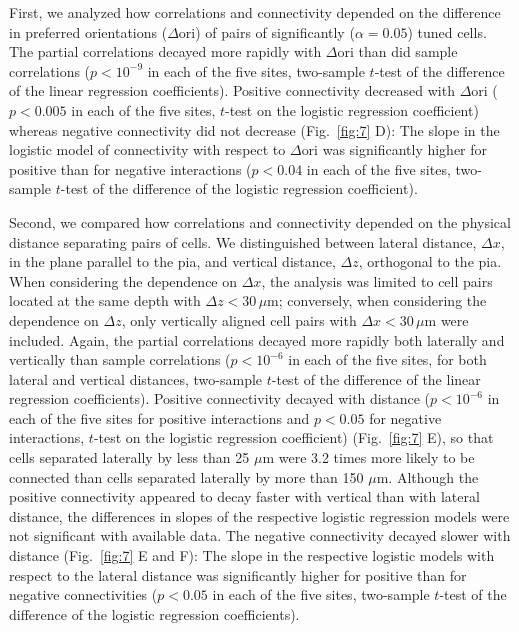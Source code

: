 First, we analyzed how correlations and connectivity depended on the difference in preferred orientations ($\Delta \mbox{ori}$) of pairs of significantly ($\alpha=0.05$) tuned cells. The partial correlations decayed more rapidly with $\Delta\mbox{ori}$ than did sample correlations ($p<10^{-9}$ in each of the five sites, two-sample $t$-test of the difference of the linear regression coefficients). Positive connectivity decreased with $\Delta\mbox{ori}$ ($p<0.005$ in each of the five sites, $t$-test on the logistic regression coefficient) whereas negative connectivity did not decrease (Fig.~\ref{fig:7} D): The slope in the logistic model of connectivity with respect to $\Delta\mbox{ori}$ was significantly higher for positive than for negative interactions ($p<0.04$ in each of the five sites, two-sample $t$-test of the difference of the logistic regression coefficient).

Second, we compared how correlations and connectivity depended on the physical distance separating pairs of cells. We distinguished between lateral distance, $\Delta x$, in the plane parallel to the pia, and vertical distance, $\Delta z$, orthogonal to the pia.  When considering the dependence on $\Delta x$, the analysis was limited to cell pairs located at the same depth with $\Delta z < 30\,\mu\mbox{m}$; conversely, when considering the dependence on $\Delta z$, only vertically aligned cell pairs with $\Delta x < 30\,\mu\mbox{m}$ were included. Again, the partial correlations decayed more rapidly both laterally and vertically than sample correlations ($p<10^{-6}$ in each of the five sites, for both lateral and vertical distances, two-sample $t$-test of the difference of the linear regression coefficients).
Positive connectivity decayed with distance ($p<10^{-6}$ in each of the five sites for positive interactions and $p<0.05$ for negative interactions, $t$-test on the logistic regression coefficient) (Fig.~\ref{fig:7} E), so that cells separated laterally by less than 25 $\mu\mbox{m}$ were 3.2 times more likely to be connected than cells separated laterally by more than 150 $\mu\mbox{m}$. Although the positive connectivity appeared to decay faster with vertical than with lateral distance, the differences in slopes of the respective logistic regression models were not significant with available data. The negative connectivity decayed slower with distance (Fig.~\ref{fig:7} E and F): The slope in the respective logistic models with respect to the lateral distance was significantly higher for positive than for negative connectivities ($p<0.05$ in each of the five sites, two-sample $t$-test of the difference of the logistic regression coefficients).